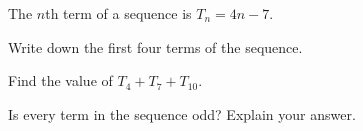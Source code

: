  The $n$th term of a sequence is $T_n=4n-7$.

\begin{subparts}
  \item Write down the first four terms of the sequence.
  \item Find the value of $T_4+T_7+T_{10}$.
  \item Is every term in the sequence odd? Explain your answer.
\end{subparts}

